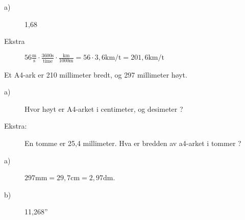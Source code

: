\documentclass[a4, 11pt, twoside]{article}
\theoremstyle{definition}
\begin{document}
\begin{Answer}
\begin{description}
\item[a)] 1,68
\item[Ekstra] $\displaystyle 56 \frac{\text{m}}{\text{s}}\cdot\frac{3600\text{s}}{\text{time}}\cdot\frac{\text{km}}{1000\text{m}} = 56\cdot3,6\text{km/t} = 201,6\text{km/t}$
\end{description}
\end{Answer}

\begin{Exercise}
Et A4-ark er 210 millimeter bredt, og 297 millimeter høyt.
\begin{description}
\item[a)] Hvor høyt er A4-arket i centimeter, og desimeter ?
\item[Ekstra:] En tomme er 25,4 millimeter. Hva er bredden av a4-arket i tommer ?
\end{description}
\end{Exercise}

\begin{Answer}
\begin{description}
\item[a)] $297\text{mm} = 29,7\text{cm} = 2,97\text{dm}$.
\item[b)] 11,268''
\end{description}
\end{Answer}

\newpage
\shipoutAnswer
\end{document}
